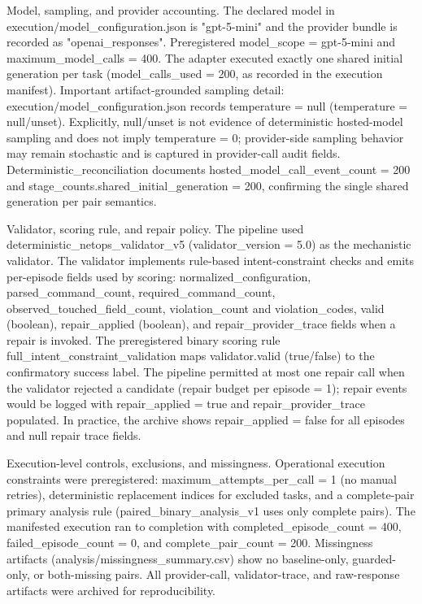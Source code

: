 \documentclass[conference]{IEEEtran}
\begin{document}
Model, sampling, and provider accounting. The declared model in execution/model\_configuration.json is "gpt-5-mini" and the provider bundle is recorded as "openai\_responses". Preregistered model\_scope = gpt-5-mini and maximum\_model\_calls = 400. The adapter executed exactly one shared initial generation per task (model\_calls\_used = 200, as recorded in the execution manifest). Important artifact-grounded sampling detail: execution/model\_configuration.json records temperature = null (temperature = null/unset). Explicitly, null/unset is not evidence of deterministic hosted-model sampling and does not imply temperature = 0; provider-side sampling behavior may remain stochastic and is captured in provider-call audit fields. Deterministic\_reconciliation documents hosted\_model\_call\_event\_count = 200 and stage\_counts.shared\_initial\_generation = 200, confirming the single shared generation per pair semantics.

Validator, scoring rule, and repair policy. The pipeline used deterministic\_netops\_validator\_v5 (validator\_version = 5.0) as the mechanistic validator. The validator implements rule-based intent-constraint checks and emits per-episode fields used by scoring: normalized\_configuration, parsed\_command\_count, required\_command\_count, observed\_touched\_field\_count, violation\_count and violation\_codes, valid (boolean), repair\_applied (boolean), and repair\_provider\_trace fields when a repair is invoked. The preregistered binary scoring rule full\_intent\_constraint\_validation maps validator.valid (true/false) to the confirmatory success label. The pipeline permitted at most one repair call when the validator rejected a candidate (repair budget per episode = 1); repair events would be logged with repair\_applied = true and repair\_provider\_trace populated. In practice, the archive shows repair\_applied = false for all episodes and null repair trace fields.

Execution-level controls, exclusions, and missingness. Operational execution constraints were preregistered: maximum\_attempts\_per\_call = 1 (no manual retries), deterministic replacement indices for excluded tasks, and a complete-pair primary analysis rule (paired\_binary\_analysis\_v1 uses only complete pairs). The manifested execution ran to completion with completed\_episode\_count = 400, failed\_episode\_count = 0, and complete\_pair\_count = 200. Missingness artifacts (analysis/missingness\_summary.csv) show no baseline-only, guarded-only, or both-missing pairs. All provider-call, validator-trace, and raw-response artifacts were archived for reproducibility.
\end{document}
